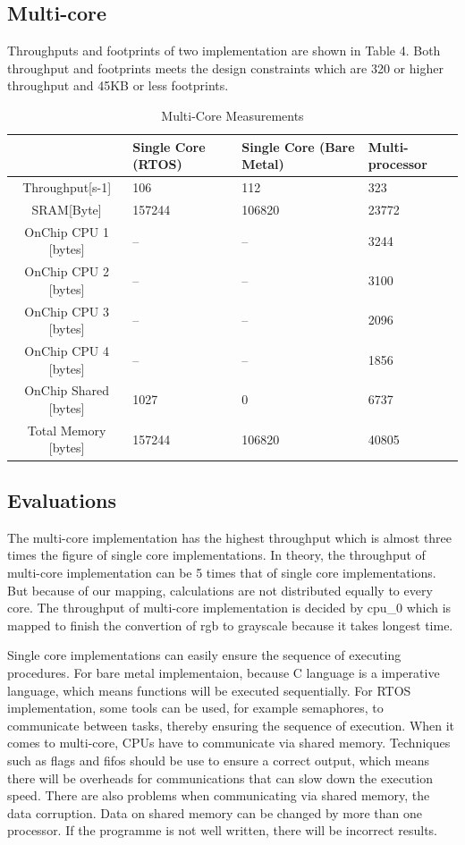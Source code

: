 \documentclass[conference,compsoc]{IEEEtran}
\begin{document}
  \subsection{Multi-core}
  Throughputs and footprints of two implementation are shown in Table 4. Both throughput and footprints meets the design constraints which are 
  320 or higher throughput and 45KB or less footprints.
  \begin{table}[h]
  \centering
  \caption{Multi-Core Measurements}
  \begin{tabularx}{8.5cm}{ c m{1cm}<{\centering} m{1cm}<{\centering} m{1cm}<{\centering} } 
  \hline
  &Single Core (RTOS)&Single Core (Bare Metal)& Multi-processor\\
  \hline
  Throughput[s-1] &106 &112& 323 \\
  SRAM[Byte]&157244 &106820 &23772 \\
  OnChip CPU 1 [bytes]&--&--&3244\\
  OnChip CPU 2 [bytes]&--&--&3100\\
  OnChip CPU 3 [bytes]&--&--&2096\\
  OnChip CPU 4 [bytes]&--&--&1856\\
  OnChip Shared [bytes]&1027&0&6737\\
  Total Memory [bytes]&157244&106820&40805\\
  \hline
  \end{tabularx}
  \end{table}
  \subsection{Evaluations}
  The multi-core implementation has the highest throughput which is almost three times the figure of single core implementations. In theory,
  the throughput of multi-core implementation can be 5 times that of single core implementations. But because of our mapping, calculations are not distributed equally to every core. The throughput 
  of multi-core implementation is decided by cpu\_0 which is mapped to finish the convertion of rgb to grayscale because it takes longest time.

  Single core implementations can easily ensure the sequence of executing procedures. For bare metal implementaion, because C language is a imperative
  language, which means functions will be executed sequentially. For RTOS implementation, some tools can be used, for example semaphores, to communicate 
  between tasks, thereby ensuring the sequence of execution. When it comes to multi-core, CPUs have to communicate via shared memory. Techniques such as flags and fifos should be use 
  to ensure a correct output, which means there will be overheads for communications that can slow down the execution speed. There are also problems when 
  communicating via shared memory, the data corruption. Data on shared memory can be changed by more than one processor. If the programme is not 
  well written, there will be incorrect results.
\end{document}
